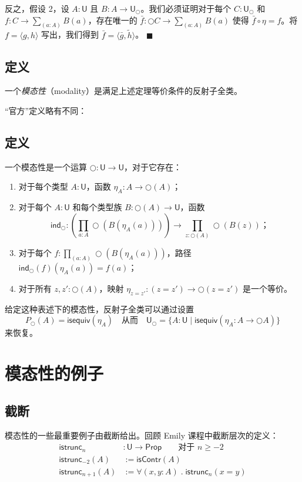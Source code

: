 \documentclass[UTF8]{ctexart}
\theoremstyle{definition}
\newcommand{\U}{\mathsf{U}}
\newcommand{\Prop}{\mathsf{Prop}}
\newcommand{\modal}{\bigcirc}
\begin{document}
反之，假设 2，设 $A:\U$ 且 $B : A \to \U_{\modal}$。我们必须证明对于每个 $C:\U_{\modal}$ 和 $f : C \to \sum_{(a:A)} B(a)$，存在唯一的 $\bar{f} : \modal C \to \sum_{(a:A)} B(a)$ 使得 $\bar{f} \circ \eta = f$。将 $f = \langle g, h\rangle$ 写出，我们得到 $\bar{f} = \langle \bar{g}, \tilde{h}\rangle$。 \hfill $\blacksquare$

\subsection{定义}

一个\emph{模态性}（modality）是满足上述定理等价条件的反射子全类。

``官方''定义略有不同：

\subsection{定义 \cite[定义 7.7.5]{Uni13}}

一个模态性是一个运算 $\modal : \U \to \U$，对于它存在：
\begin{enumerate}
    \item 对于每个类型 $A:\U$，函数 $\eta_A : A \to \modal(A)$；
    \item 对于每个 $A:\U$ 和每个类型族 $B : \modal(A) \to \U$，函数
    \[
    \mathsf{ind}_{\modal} : \left(\prod_{a:A} \modal(B(\eta_A(a)))\right) \to \prod_{z:\modal(A)} \modal(B(z))；
    \]
    \item 对于每个 $f : \prod_{(a:A)} \modal(B(\eta_A(a)))$，路径 $\mathsf{ind}_{\modal}(f)(\eta_A(a)) = f(a)$；
    \item 对于所有 $z, z' : \modal(A)$，映射 $\eta_{z=z'} : (z=z') \to \modal(z=z')$ 是一个等价。
\end{enumerate}

给定这种表述下的模态性，反射子全类可以通过设置
\[
P_{\modal}(A) = \mathsf{isequiv}(\eta_A) \quad\text{从而}\quad \U_{\modal} = \{A:\U \mid \mathsf{isequiv}(\eta_A : A \to \modal A)\}
\]
来恢复。

\section{模态性的例子}

\subsection{截断}

模态性的一些最重要例子由截断给出。回顾 Emily 课程中截断层次的定义：
\begin{align*}
\mathsf{istrunc}_n &: \U \to \Prop \qquad \text{对于 } n \geq -2 \\
\mathsf{istrunc}_{-2}(A) &:= \mathsf{isContr}(A) \\
\mathsf{istrunc}_{n+1}(A) &:= \forall(x,y:A)\;.\; \mathsf{istrunc}_n(x=y)
\end{align*}
\end{document}
